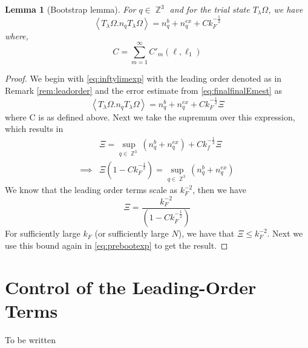 \documentclass[12pt,a4paper]{article}
\numberwithin{equation}{section}
\newcommand{\1}{\mathbb{I}}
\DeclareMathOperator{\Z}{\mathbb{Z}}
\newcommand{\eva}[1]{\left\langle #1 \right\rangle}
\theoremstyle{plain}
\newtheorem{lemma}[theorem]{Lemma}
\theoremstyle{definition}
\theoremstyle{remark}
\theoremstyle{plain}
\theoremstyle{definition}
\theoremstyle{remark}
\begin{document}
\begin{lemma}[Bootstrap lemma]
	For $q \in \Z^3$ and for the trial state $T_{\lambda}\Omega$, we have 
	\begin{equation}
		\eva{ T_{\lambda}\Omega. n_q T_{\lambda}\Omega} = n_q^b + n_q^{ex} + C k_F^{-\frac{5}{2}}
	\end{equation}
where, 
\begin{equation}
	C = \sum\limits_{m=1}^\infty C'_m(\ell,\ell_1)
\end{equation}
\end{lemma}
\begin{proof}
	We begin with \eqref{eq:inftylimexp} with the leading order denoted as in Remark \ref{rem:leadorder} and the error estimate from \eqref{eq:finalfinalEmest} as
	\begin{equation}\label{eq:prebootexp}
		\eva{ T_{\lambda}\Omega. n_q T_{\lambda}\Omega} = n_q^b + n_q^{ex} + C k_F^{-\frac{1}{2}}\Xi
\end{equation}
where C is as defined above. Next we take the supremum over this expression, which results in
\begin{align}
	&\Xi = \sup_{q \in \Z^3}(n_q^b + n_q^{ex}) + C k_f^{-\frac{1}{2}}\Xi \nonumber\\
	\implies &\Xi(1 - Ck_F^{-\frac{1}{2}}) = \sup_{q \in \Z^3}(n_q^b + n_q^{ex})
\end{align}
We know that the leading order terms scale as $k_F^{-2}$, then we have 
\begin{equation}
	\Xi = \frac{k_F^{-2}}{(1 - Ck_F^{-\frac{1}{2}})}
\end{equation}
For sufficiently large $k_F$ (or sufficiently large $N$), we have that $\Xi\leq k_F^{-2}$. Next we use this bound again in \eqref{eq:prebootexp} to get the result.
\end{proof}




\section{Control of the Leading-Order Terms}
\label{subsec:leading_order_control}


To be written
\end{document}
